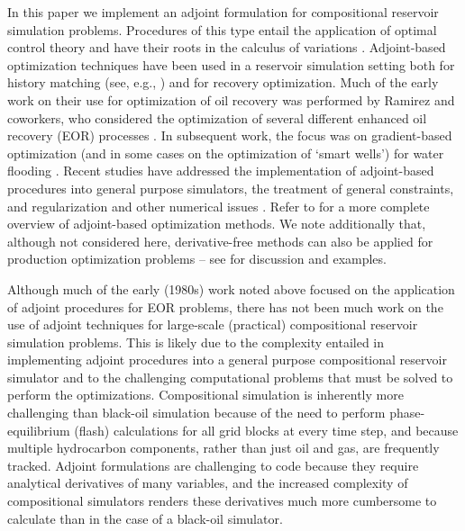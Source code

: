 \documentclass[twocolumn,numbook]{svjour3}          %
\begin{document}
In this paper we implement an adjoint formulation for compositional reservoir
simulation problems. Procedures of this type entail the application of optimal
control theory and have their roots in the calculus of variations
\cite{Bryson:1975,Stengel:1986}. Adjoint-based optimization techniques have been
used in a reservoir simulation setting both for history matching (see, e.g.,
  \cite{Gavalas,Chavent,Li,Oliver,Pallav:2006}) and for recovery optimization.
Much of the early work on their use for optimization of oil recovery was performed by
Ramirez and coworkers, who considered the optimization of several different
enhanced oil recovery (EOR) processes
\cite{Ramirez:book,Ramirez:1989,Ramirez:1993}. In subsequent work, the focus was
on gradient-based optimization (and in some cases on the optimization of `smart
  wells') for water flooding
\cite{Asheim,Virnovski,Sudaryanto:2000,Brouwer:2004,Pallav:2006}. Recent studies
have addressed the implementation of adjoint-based procedures into general
purpose simulators, the treatment of general constraints, and regularization and
other numerical issues \cite{Pallav:2008,Brouwer:2008,Doublet:2009,CPRA}. Refer
to \cite{Jansen:2011} for a more complete overview of adjoint-based optimization
methods. We note additionally that, although not considered here, derivative-free
methods can also be applied for production optimization problems -- see
\cite{echeverria:2011} for discussion and examples.

Although much of the early (1980s) work noted above focused on the application
of adjoint procedures for EOR problems, there has not been much work on the use
of adjoint techniques for large-scale (practical) compositional reservoir
simulation problems. This is likely due to the complexity entailed in
implementing adjoint procedures into a general purpose compositional reservoir
simulator and to the challenging computational problems that must be solved to
perform the optimizations. Compositional simulation is inherently more
challenging than black-oil simulation because of the need to perform
phase-equilibrium (flash) calculations for all grid blocks at every time step,
and because multiple hydrocarbon components, rather than just oil
and gas, are frequently tracked. Adjoint formulations are challenging to code
because they require analytical derivatives of many variables, and the
increased complexity of compositional simulators renders these derivatives
much more cumbersome to calculate than in the case of a black-oil simulator.
\end{document}
